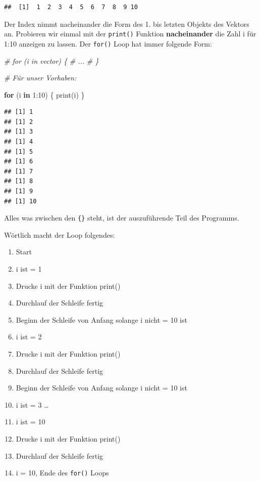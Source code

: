 \documentclass[
]{book}
\newenvironment{Shaded}{\begin{snugshade}}{\end{snugshade}}
\newcommand{\CommentTok}[1]{\textcolor[rgb]{0.56,0.35,0.01}{\textit{#1}}}
\newcommand{\ControlFlowTok}[1]{\textcolor[rgb]{0.13,0.29,0.53}{\textbf{#1}}}
\newcommand{\DecValTok}[1]{\textcolor[rgb]{0.00,0.00,0.81}{#1}}
\newcommand{\FunctionTok}[1]{\textcolor[rgb]{0.00,0.00,0.00}{#1}}
\newcommand{\NormalTok}[1]{#1}
\newcommand{\SpecialCharTok}[1]{\textcolor[rgb]{0.00,0.00,0.00}{#1}}
\providecommand{\tightlist}{%
  \setlength{\itemsep}{0pt}\setlength{\parskip}{0pt}}
\begin{document}
\begin{verbatim}
##  [1]  1  2  3  4  5  6  7  8  9 10
\end{verbatim}

Der Index nimmt nacheinander die Form des 1. bis letzten Objekts des Vektors an. Probieren wir einmal mit der \texttt{print()} Funktion \textbf{nacheinander} die Zahl i für 1:10 anzeigen zu lassen. Der \texttt{for()} Loop hat immer folgende Form:

\begin{Shaded}
\begin{Highlighting}[]
\CommentTok{\# for (i in vector) \{}
\CommentTok{\#   ...}
\CommentTok{\# \}}

\CommentTok{\# Für unser Vorhaben:}

\ControlFlowTok{for}\NormalTok{ (i }\ControlFlowTok{in} \DecValTok{1}\SpecialCharTok{:}\DecValTok{10}\NormalTok{) \{}
  \FunctionTok{print}\NormalTok{(i)}
\NormalTok{\}}
\end{Highlighting}
\end{Shaded}

\begin{verbatim}
## [1] 1
## [1] 2
## [1] 3
## [1] 4
## [1] 5
## [1] 6
## [1] 7
## [1] 8
## [1] 9
## [1] 10
\end{verbatim}

Alles was zwischen den \texttt{\{\}} steht, ist der auszuführende Teil des Programms.

Wörtlich macht der Loop folgendes:

\begin{enumerate}
\def\labelenumi{\arabic{enumi}.}
\tightlist
\item
  Start
\item
  i ist = 1
\item
  Drucke i mit der Funktion print()
\item
  Durchlauf der Schleife fertig
\item
  Beginn der Schleife von Anfang solange i nicht = 10 ist
\item
  i ist = 2
\item
  Drucke i mit der Funktion print()
\item
  Durchlauf der Schleife fertig
\item
  Beginn der Schleife von Anfang solange i nicht = 10 ist
\item
  i ist = 3 \ldots{}
\item
  i ist = 10
\item
  Drucke i mit der Funktion print()
\item
  Durchlauf der Schleife fertig
\item
  i = 10, Ende des \texttt{for()} Loops
\end{enumerate}
\end{document}
